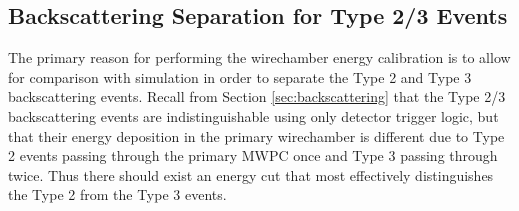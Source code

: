 \subsection{Backscattering Separation for Type 2/3 Events} \label{sssec:backscSep}
The primary reason for performing the wirechamber energy calibration is to allow
for comparison with simulation in order to separate the Type 2 and Type 3 backscattering events. Recall from Section
\ref{sec:backscattering} that the Type 2/3 backscattering events are
indistinguishable using only detector trigger logic, but that their energy
deposition in the primary wirechamber is different due to Type 2 events passing
through the primary MWPC once and Type 3 passing through twice. Thus there should exist an energy cut that most effectively
distinguishes the Type 2 from the Type 3 events. 

